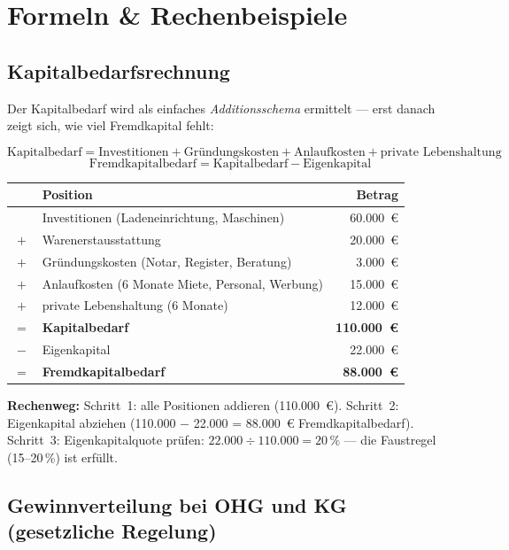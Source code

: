 \documentclass[11pt, a4paper]{article}
\begin{document}
\section{Formeln \& Rechenbeispiele}

\subsection{Kapitalbedarfsrechnung}

Der Kapitalbedarf wird als einfaches \emph{Additionsschema} ermittelt --- erst danach
zeigt sich, wie viel Fremdkapital fehlt:

\[
\textrm{Kapitalbedarf} = \textrm{Investitionen} + \textrm{Gründungskosten}
+ \textrm{Anlaufkosten} + \textrm{private Lebenshaltung}
\]
\[
\textrm{Fremdkapitalbedarf} = \textrm{Kapitalbedarf} - \textrm{Eigenkapital}
\]

\begin{beispiel}[title={\bfseries Zahlenbeispiel: Kapitalbedarf einer Ladengründung}]
\begin{center}
\begin{tabular}{clr}
\toprule
 & \textbf{Position} & \textbf{Betrag}\\
\midrule
 & Investitionen (Ladeneinrichtung, Maschinen) & 60.000~€\\
$+$ & Warenerstausstattung & 20.000~€\\
$+$ & Gründungskosten (Notar, Register, Beratung) & 3.000~€\\
$+$ & Anlaufkosten (6 Monate Miete, Personal, Werbung) & 15.000~€\\
$+$ & private Lebenshaltung (6 Monate) & 12.000~€\\
\midrule
$=$ & \textbf{Kapitalbedarf} & \textbf{110.000~€}\\
$-$ & Eigenkapital & 22.000~€\\
\midrule
$=$ & \textbf{Fremdkapitalbedarf} & \textbf{88.000~€}\\
\bottomrule
\end{tabular}
\end{center}
\textbf{Rechenweg:} Schritt~1: alle Positionen addieren (110.000~€).
Schritt~2: Eigenkapital abziehen (110.000 $-$ 22.000 = 88.000~€ Fremdkapitalbedarf).
Schritt~3: Eigenkapitalquote prüfen: $22.000 \div 110.000 = 20\,\%$ ---
die Faustregel (15--20\,\%) ist erfüllt.
\end{beispiel}

\subsection{Gewinnverteilung bei OHG und KG (gesetzliche Regelung)}
\end{document}
